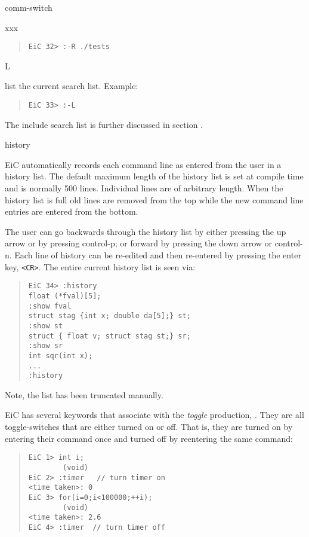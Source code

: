 \begin{Ventry}{comm-switch }
\begin{Ventry}{xxx}
\begin{quote}
\begin{verbatim}
EiC 32> :-R ./tests
\end{verbatim}
\end{quote}


        \item[L]   
 
        list the current search list. Example:

\begin{quote}
\begin{verbatim}
EiC 33> :-L
\end{verbatim}
\end{quote}

        The include search list is further discussed in section 
        .

        \end{Ventry}

\item[history]
\label{item:history} 

EiC automatically records each command line as entered from the user
in a history list. The default maximum length of the history list
 is set at compile time and is normally 500
lines. Individual lines are of arbitrary length.  When the history
list is full old lines are removed from the top while the new command
line entries are entered from the bottom.

The user can go backwards through the history list by either pressing
the up arrow or by pressing control-p; or forward by pressing the
down arrow or control-n. Each line of history can be re-edited and
then re-entered by pressing the enter key, \verb+<CR>+. The entire current
history list is seen via:

\begin{quote}
\begin{verbatim}
EiC 34> :history
float (*fval)[5];
:show fval
struct stag {int x; double da[5];} st;
:show st
struct { float v; struct stag st;} sr;
:show sr
int sqr(int x);
...
:history
\end{verbatim}
\end{quote}

Note, the list has been truncated manually.
\end{Ventry}
\normalsize

EiC has several  keywords that associate with the {\it toggle} production,
.  They are all toggle-switches  
that are either turned on or off.  That is, they are turned on by
entering their command once and turned off by reentering the same
command:
\begin{quote}
\begin{verbatim}
EiC 1> int i;
        (void)
EiC 2> :timer   // turn timer on
<time taken>: 0
EiC 3> for(i=0;i<100000;++i);
        (void)
<time taken>: 2.6
EiC 4> :timer  // turn timer off
\end{verbatim}
\end{quote}


